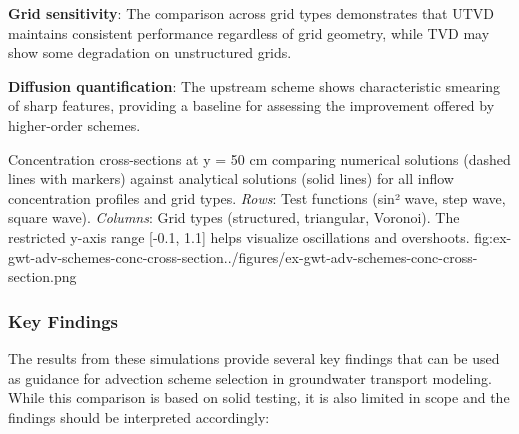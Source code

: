 \textbf{Grid sensitivity}: The comparison across grid types demonstrates that UTVD maintains consistent performance regardless of grid geometry, while TVD may show some degradation on unstructured grids.

\textbf{Diffusion quantification}: The upstream scheme shows characteristic smearing of sharp features, providing a baseline for assessing the improvement offered by higher-order schemes.

\begin{StandardFigure}{
    Concentration cross-sections at y = 50 cm comparing numerical solutions (dashed lines with markers) against analytical solutions (solid lines) for all inflow concentration profiles and grid types. \textit{Rows}: Test functions (sin² wave, step wave, square wave). \textit{Columns}: Grid types (structured, triangular, Voronoi). The restricted y-axis range [-0.1, 1.1] helps visualize oscillations and overshoots.
}{fig:ex-gwt-adv-schemes-conc-cross-section}{../figures/ex-gwt-adv-schemes-conc-cross-section.png}
\end{StandardFigure}

\subsubsection{Key Findings}

The results from these simulations provide several key findings that can be used as guidance for advection scheme selection in groundwater transport modeling. While this comparison is based on solid testing, it is also limited in scope and the findings should be interpreted accordingly:

